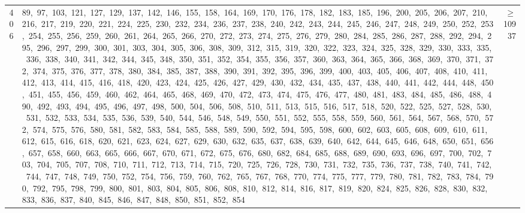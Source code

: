 \begin{longtable}{c|p{}|r}
406 & 89,\ 97,\ 103,\ 121,\ 127,\ 129,\ 137,\ 142,\ 146,\ 155,\ 158,\ 164,\ 169,\ 170,\ 176,\ 178,\ 182,\ 183,\ 185,\ 196,\ 200,\ 205,\ 206,\ 207,\ 210,\ 216,\ 217,\ 219,\ 220,\ 221,\ 224,\ 225,\ 230,\ 232,\ 234,\ 236,\ 237,\ 238,\ 240,\ 242,\ 243,\ 244,\ 245,\ 246,\ 247,\ 248,\ 249,\ 250,\ 252,\ 253,\ 254,\ 255,\ 256,\ 259,\ 260,\ 261,\ 264,\ 265,\ 266,\ 270,\ 272,\ 273,\ 274,\ 275,\ 276,\ 279,\ 280,\ 284,\ 285,\ 286,\ 287,\ 288,\ 292,\ 294,\ 295,\ 296,\ 297,\ 299,\ 300,\ 301,\ 303,\ 304,\ 305,\ 306,\ 308,\ 309,\ 312,\ 315,\ 319,\ 320,\ 322,\ 323,\ 324,\ 325,\ 328,\ 329,\ 330,\ 333,\ 335,\ 336,\ 338,\ 340,\ 341,\ 342,\ 344,\ 345,\ 348,\ 350,\ 351,\ 352,\ 354,\ 355,\ 356,\ 357,\ 360,\ 363,\ 364,\ 365,\ 366,\ 368,\ 369,\ 370,\ 371,\ 372,\ 374,\ 375,\ 376,\ 377,\ 378,\ 380,\ 384,\ 385,\ 387,\ 388,\ 390,\ 391,\ 392,\ 395,\ 396,\ 399,\ 400,\ 403,\ 405,\ 406,\ 407,\ 408,\ 410,\ 411,\ 412,\ 413,\ 414,\ 415,\ 416,\ 418,\ 420,\ 423,\ 424,\ 425,\ 426,\ 427,\ 429,\ 430,\ 432,\ 434,\ 435,\ 437,\ 438,\ 440,\ 441,\ 442,\ 444,\ 448,\ 450,\ 451,\ 455,\ 456,\ 459,\ 460,\ 462,\ 464,\ 465,\ 468,\ 469,\ 470,\ 472,\ 473,\ 474,\ 475,\ 476,\ 477,\ 480,\ 481,\ 483,\ 484,\ 485,\ 486,\ 488,\ 490,\ 492,\ 493,\ 494,\ 495,\ 496,\ 497,\ 498,\ 500,\ 504,\ 506,\ 508,\ 510,\ 511,\ 513,\ 515,\ 516,\ 517,\ 518,\ 520,\ 522,\ 525,\ 527,\ 528,\ 530,\ 531,\ 532,\ 533,\ 534,\ 535,\ 536,\ 539,\ 540,\ 544,\ 546,\ 548,\ 549,\ 550,\ 551,\ 552,\ 555,\ 558,\ 559,\ 560,\ 561,\ 564,\ 567,\ 568,\ 570,\ 572,\ 574,\ 575,\ 576,\ 580,\ 581,\ 582,\ 583,\ 584,\ 585,\ 588,\ 589,\ 590,\ 592,\ 594,\ 595,\ 598,\ 600,\ 602,\ 603,\ 605,\ 608,\ 609,\ 610,\ 611,\ 612,\ 615,\ 616,\ 618,\ 620,\ 621,\ 623,\ 624,\ 627,\ 629,\ 630,\ 632,\ 635,\ 637,\ 638,\ 639,\ 640,\ 642,\ 644,\ 645,\ 646,\ 648,\ 650,\ 651,\ 656,\ 657,\ 658,\ 660,\ 663,\ 665,\ 666,\ 667,\ 670,\ 671,\ 672,\ 675,\ 676,\ 680,\ 682,\ 684,\ 685,\ 688,\ 689,\ 690,\ 693,\ 696,\ 697,\ 700,\ 702,\ 703,\ 704,\ 705,\ 707,\ 708,\ 710,\ 711,\ 712,\ 713,\ 714,\ 715,\ 720,\ 725,\ 726,\ 728,\ 730,\ 731,\ 732,\ 735,\ 736,\ 737,\ 738,\ 740,\ 741,\ 742,\ 744,\ 747,\ 748,\ 749,\ 750,\ 752,\ 754,\ 756,\ 759,\ 760,\ 762,\ 765,\ 767,\ 768,\ 770,\ 774,\ 775,\ 777,\ 779,\ 780,\ 781,\ 782,\ 783,\ 784,\ 790,\ 792,\ 795,\ 798,\ 799,\ 800,\ 801,\ 803,\ 804,\ 805,\ 806,\ 808,\ 810,\ 812,\ 814,\ 816,\ 817,\ 819,\ 820,\ 824,\ 825,\ 826,\ 828,\ 830,\ 832,\ 833,\ 836,\ 837,\ 840,\ 845,\ 846,\ 847,\ 848,\ 850,\ 851,\ 852,\ 854 & $\ge$ 10937 \\

\end{longtable}
